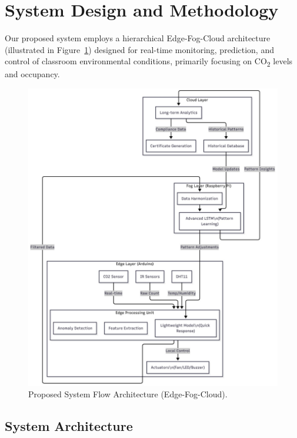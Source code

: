 \section{System Design and Methodology}
\label{sec:methodology}

Our proposed system employs a hierarchical Edge-Fog-Cloud architecture (illustrated in Figure~\ref{fig:system_architecture}) designed for real-time monitoring, prediction, and control of classroom environmental conditions, primarily focusing on CO\textsubscript{2} levels and occupancy.

\begin{figure}[htbp] %
    \centering
    \includegraphics[width=0.9\linewidth]{figures/workflow.jpg (1).jpeg} %
    \caption{Proposed System Flow Architecture (Edge-Fog-Cloud).}
    \label{fig:system_architecture}
\end{figure}

\subsection{System Architecture}

